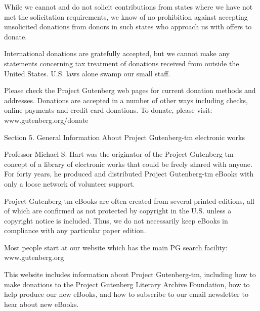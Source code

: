 \documentclass[oneside]{book}
\begin{document}
\begin{text}
While we cannot and do not solicit contributions from states where we
have not met the solicitation requirements, we know of no prohibition
against accepting unsolicited donations from donors in such states who
approach us with offers to donate.

International donations are gratefully accepted, but we cannot make
any statements concerning tax treatment of donations received from
outside the United States. U.S. laws alone swamp our small staff.

Please check the Project Gutenberg web pages for current donation
methods and addresses. Donations are accepted in a number of other
ways including checks, online payments and credit card donations. To
donate, please visit: www.gutenberg.org/donate

Section 5. General Information About Project Gutenberg-tm electronic works

Professor Michael S. Hart was the originator of the Project
Gutenberg-tm concept of a library of electronic works that could be
freely shared with anyone. For forty years, he produced and
distributed Project Gutenberg-tm eBooks with only a loose network of
volunteer support.

Project Gutenberg-tm eBooks are often created from several printed
editions, all of which are confirmed as not protected by copyright in
the U.S. unless a copyright notice is included. Thus, we do not
necessarily keep eBooks in compliance with any particular paper
edition.

Most people start at our website which has the main PG search
facility: www.gutenberg.org

This website includes information about Project Gutenberg-tm,
including how to make donations to the Project Gutenberg Literary
Archive Foundation, how to help produce our new eBooks, and how to
subscribe to our email newsletter to hear about new eBooks.
\end{text}
\end{document}

